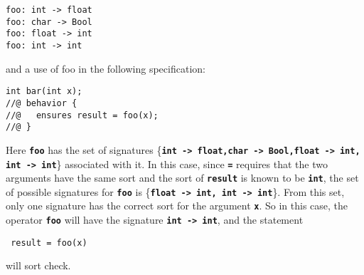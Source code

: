 \documentclass[12pt]{article} %
\newcommand{\reserved}[1]{\textbf{\texttt{#1}}} %
\begin{document}
\begin{verbatim}
foo: int -> float
foo: char -> Bool
foo: float -> int
foo: int -> int
\end{verbatim}

\noindent and a use of foo in the following specification:

\begin{verbatim}
int bar(int x);
//@ behavior {
//@   ensures result = foo(x);
//@ }
\end{verbatim}

\noindent Here \reserved{foo} has the set of signatures \{\reserved{int -> float,char
-> Bool,float -> int, int -> int}\} associated with it. In this case,
since \reserved{=} requires that the two arguments have the same sort
and the sort of \reserved{result} is known to be \reserved{int}, the
set of possible signatures for \reserved{foo} is \{\reserved{float ->
int, int -> int}\}. From this set, only one signature has the correct
sort for the argument \reserved{x}. So in this case, the operator
\reserved{foo} will have the signature \reserved{int -> int}, and the
statement \begin{verbatim} result = foo(x) \end{verbatim} will sort
check.
\end{document}
